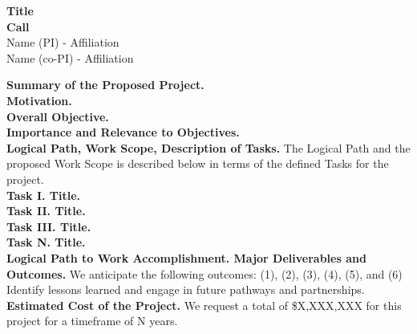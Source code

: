 \documentclass[11pt,letterpaper]{article}
\begin{document}
{\centering 
    \textbf{Title\\
    Call\\
    }
    Name (PI) - Affiliation\\
    Name (co-PI) - Affiliation 
\par
}
\vspace{\baselineskip}

\noindent\textbf{Summary of the Proposed Project.} 
\\

\noindent\textbf{Motivation.}
\\

\noindent\textbf{Overall Objective.}
\\

\noindent\textbf{Importance and Relevance to Objectives.}
\\

\noindent\textbf{Logical Path, Work Scope, Description of Tasks.} The Logical Path and the proposed Work Scope is described below in terms of the defined Tasks for the project.
\\

\noindent\textbf{Task I. Title.}
\\

\noindent\textbf{Task II. Title.}
\\

\noindent\textbf{Task III. Title.}
\\

\noindent\textbf{Task N. Title.}
\\

\noindent\textbf{Logical Path to Work Accomplishment. Major Deliverables and Outcomes.} We anticipate the following outcomes: (1), (2), (3), (4), (5), and (6) Identify lessons learned and engage in future pathways and partnerships.
\\

\noindent\textbf{Estimated Cost of the Project.} We request a total of \$X,XXX,XXX for this project for a timeframe of N years.
\\
\end{document}

